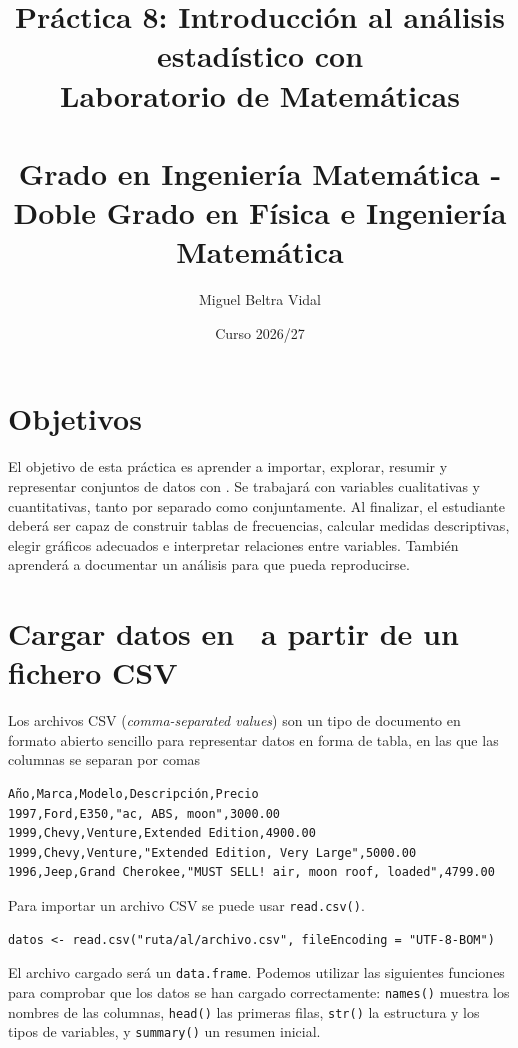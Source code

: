 \documentclass[11pt,a4paper]{article}
\title{\LARGE\textbf{Práctica 8: Introducción al análisis estadístico con \R}\\[0.5em]
\Large Laboratorio de Matemáticas\\
\small\ \\
\Large Grado en Ingeniería Matemática - Doble Grado en Física e Ingeniería Matemática}
\author{Miguel Beltra Vidal}
\date{Curso 2026/27}
\newcommand{\R}{\textcolor{azuluc}{\faIcon{r-project}}}
\theoremstyle{exercise}
\begin{document}
\maketitle






\section{Objetivos}

El objetivo de esta práctica es aprender a importar, explorar, resumir y representar conjuntos de datos con \R. Se trabajará con variables cualitativas y cuantitativas, tanto por separado como conjuntamente. Al finalizar, el estudiante deberá ser capaz de construir tablas de frecuencias, calcular medidas descriptivas, elegir gráficos adecuados e interpretar relaciones entre variables. También aprenderá a documentar un análisis para que pueda reproducirse.


\section{Cargar datos en \R\ a partir de un fichero CSV}

Los archivos CSV (\emph{comma-separated values}) son un tipo de documento en formato abierto sencillo para representar datos en forma de tabla, en las que las columnas se separan por comas

\medskip

\begin{lstlisting}[style=mdstyle]
Año,Marca,Modelo,Descripción,Precio
1997,Ford,E350,"ac, ABS, moon",3000.00
1999,Chevy,Venture,Extended Edition,4900.00
1999,Chevy,Venture,"Extended Edition, Very Large",5000.00
1996,Jeep,Grand Cherokee,"MUST SELL! air, moon roof, loaded",4799.00
\end{lstlisting}

\medskip

\noindent Para importar un archivo CSV se puede usar \texttt{read.csv()}. 

\medskip

\begin{lstlisting}[style=rstyle]
datos <- read.csv("ruta/al/archivo.csv", fileEncoding = "UTF-8-BOM")
\end{lstlisting}

\medskip

El archivo cargado será un \texttt{data.frame}. Podemos utilizar las siguientes funciones para comprobar que los datos se han cargado correctamente: \texttt{names()} muestra los nombres de las columnas, \texttt{head()} las primeras filas, \texttt{str()} la estructura y los tipos de variables, y \texttt{summary()} un resumen inicial.
\end{document}
